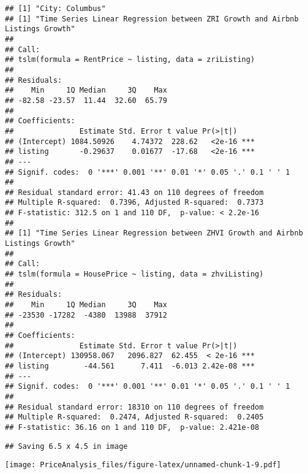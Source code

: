 \documentclass[
]{article}
\begin{document}
\begin{verbatim}
## [1] "City: Columbus"
## [1] "Time Series Linear Regression between ZRI Growth and Airbnb Listings Growth"
## 
## Call:
## tslm(formula = RentPrice ~ listing, data = zriListing)
## 
## Residuals:
##    Min     1Q Median     3Q    Max 
## -82.58 -23.57  11.44  32.60  65.79 
## 
## Coefficients:
##               Estimate Std. Error t value Pr(>|t|)    
## (Intercept) 1084.50926    4.74372  228.62   <2e-16 ***
## listing       -0.29637    0.01677  -17.68   <2e-16 ***
## ---
## Signif. codes:  0 '***' 0.001 '**' 0.01 '*' 0.05 '.' 0.1 ' ' 1
## 
## Residual standard error: 41.43 on 110 degrees of freedom
## Multiple R-squared:  0.7396, Adjusted R-squared:  0.7373 
## F-statistic: 312.5 on 1 and 110 DF,  p-value: < 2.2e-16
## 
## [1] "Time Series Linear Regression between ZHVI Growth and Airbnb Listings Growth"
## 
## Call:
## tslm(formula = HousePrice ~ listing, data = zhviListing)
## 
## Residuals:
##    Min     1Q Median     3Q    Max 
## -23530 -17282  -4380  13988  37912 
## 
## Coefficients:
##               Estimate Std. Error t value Pr(>|t|)    
## (Intercept) 130958.067   2096.827  62.455  < 2e-16 ***
## listing        -44.561      7.411  -6.013 2.42e-08 ***
## ---
## Signif. codes:  0 '***' 0.001 '**' 0.01 '*' 0.05 '.' 0.1 ' ' 1
## 
## Residual standard error: 18310 on 110 degrees of freedom
## Multiple R-squared:  0.2474, Adjusted R-squared:  0.2405 
## F-statistic: 36.16 on 1 and 110 DF,  p-value: 2.421e-08
\end{verbatim}

\begin{verbatim}
## Saving 6.5 x 4.5 in image
\end{verbatim}

\texttt{[image: PriceAnalysis\_files/figure-latex/unnamed-chunk-1-9.pdf]}
\end{document}
